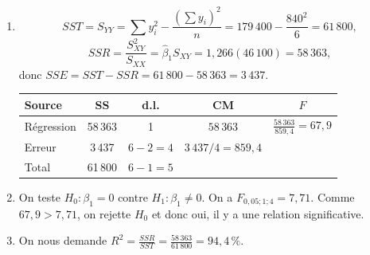 \begin{exercice}
\begin{solution}
\begin{enumerate}[label=(\alph*)]
  Interprétations : $\hat\beta_0=0,7$ : s'il y a 0 pneu l'année précédente, on espère en
  moyenne 0,7 pneu cette année. $\hat\beta_1=1,266$ : si le nombre de pneus l'année
  précédente augmente de 1 pneu, l'inventaire espéré pour l'année courante augmente de
  1,266 pneu.
  \item
  \[
    SST=S_{YY}=\sum y_i^2-\frac{\left(\sum y_i\right)^2}{n}=179\,400-\frac{840^2}{6}=61\,800,
  \]
  \[
    SSR=\frac{S_{XY}^2}{S_{XX}}=\hat\beta_1S_{XY}=1,266(46\,100)=58\,363,
  \]
  donc $SSE=SST-SSR=61\,800-58\,363=3\,437$.
  \begin{center}
  \begin{tabular}{lcccc}
    \toprule
    Source & SS & d.l. & CM & $F$\\
    \midrule
    Régression & 58\,363 & 1 & $58\,363$ & $\frac{58\,363}{859,4}=67,9$\\[3pt]
    Erreur & 3\,437 & $6-2=4$ & $3\,437/4=859,4$ & \\[3pt]
    Total & 61\,800 & $6-1=5$ & & \\
    \bottomrule
  \end{tabular}
  \end{center}
  \item On teste $H_0:\beta_1=0$ contre $H_1:\beta_1\neq 0$. On a $F_{0,05;1;4}=7,71$.
  Comme $67,9>7,71$, on rejette $H_0$ et donc oui, il y a une relation significative.
  \item On nous demande $R^2=\frac{SSR}{SST}=\frac{58\,363}{61\,800}=94,4\,\%$.
\end{enumerate}
\end{solution}
\end{exercice}

